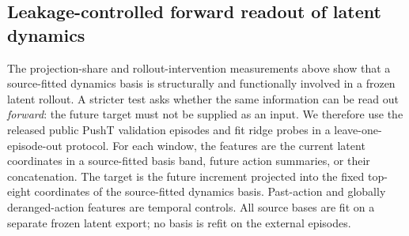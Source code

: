 \documentclass{article}
\begin{document}
\subsection{Leakage-controlled forward readout of latent dynamics}
\label{sec:supp-forward-dynamics-readout}

The projection-share and rollout-intervention measurements above show that a
source-fitted dynamics basis is structurally and functionally involved in a
frozen latent rollout. A stricter test asks whether the same information can
be read out \emph{forward}: the future target must not be supplied as an
input. We therefore use the released public PushT validation episodes and
fit ridge probes in a leave-one-episode-out protocol. For each window, the
features are the current latent coordinates in a source-fitted basis band,
future action summaries, or their concatenation. The target is the future
increment projected into the fixed top-eight coordinates of the
source-fitted dynamics basis. Past-action and globally deranged-action
features are temporal controls. All source bases are fit on a separate
frozen latent export; no basis is refit on the external episodes.

\begin{table}[H]
\centering
\scriptsize
\setlength{\tabcolsep}{3pt}
\caption{Leakage-controlled forward readout of a fixed dynamics target at
$h=8$. Each row uses the same target, 21 held-out episodes, eight windows per
episode when available, and 2,000 episode-bootstrap replicates. $R^2$ is
computed on the held-out episode using the training-fold target mean; the
gain is the paired state-plus-action minus action-only contrast. The final
column compares each input basis with the dynamics top-8 input on the same
target.}
\label{tab:supp-forward-dynamics-readout}
\end{table}
\end{document}
